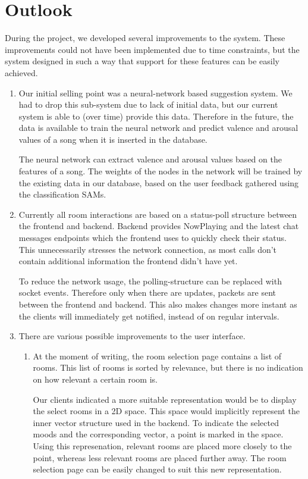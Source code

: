 \chapter{Outlook}
During the project, we developed several improvements to the system.
These improvements could not have been implemented due to time constraints, but the system designed in such a way that support for these features can be easily achieved.

\begin{enumerate}
\item Our initial selling point was a neural-network based suggestion system.
We had to drop this sub-system due to lack of initial data, but our current system is able to (over time) provide this data.
Therefore in the future, the data is available to train the neural network and predict valence and arousal values of a song when it is inserted in the database.

The neural network can extract valence and arousal values based on the features of a song.
The weights of the nodes in the network will be trained by the existing data in our database, based on the user feedback gathered using the classification SAMs.

\item Currently all room interactions are based on a status-poll structure between the frontend and backend.
Backend provides NowPlaying and the latest chat messages endpoints which the frontend uses to quickly check their status.
This unnecessarily stresses the network connection, as most calls don't contain additional information the frontend didn't have yet.

To reduce the network usage, the polling-structure can be replaced with socket events.
Therefore only when there are updates, packets are sent between the frontend and backend.
This also makes changes more instant as the clients will immediately get notified, instead of on regular intervals.

\item There are various possible improvements to the user interface.

\begin{enumerate}
\item At the moment of writing, the room selection page contains a list of rooms.
This list of rooms is sorted by relevance, but there is no indication on how relevant a certain room is.

Our clients indicated a more suitable representation would be to display the select rooms in a 2D space.
This space would implicitly represent the inner vector structure used in the backend.
To indicate the selected moods and the corresponding vector, a point is marked in the space.
Using this represenation, relevant rooms are placed more closely to the point, whereas less relevant rooms are placed further away. The room selection page can be easily changed to suit this new representation.


\end{enumerate}
\end{enumerate}
